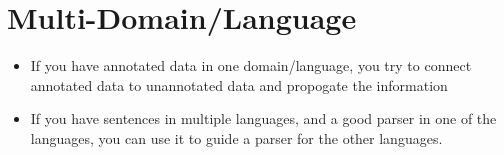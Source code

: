 \documentclass[11pt,letterpaper]{article}
\begin{document}
\section{Multi-Domain/Language}

\begin{itemize}
  \item If you have annotated data in one domain/language, you try to connect annotated data to unannotated data and propogate the information
  \item If you have sentences in multiple languages, and a good parser in one of the languages, you can use it to guide a parser for the other languages.
\end{itemize}
\end{document}
